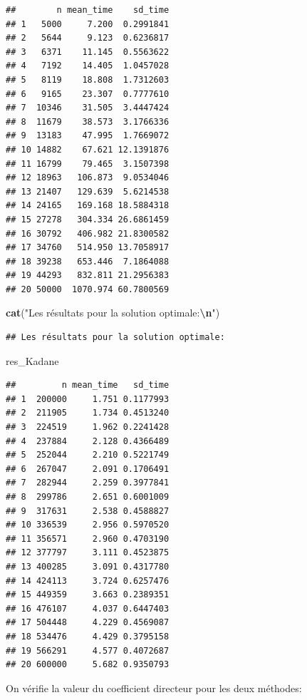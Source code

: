 \documentclass[
]{article}
\newenvironment{Shaded}{\begin{snugshade}}{\end{snugshade}}
\newcommand{\FunctionTok}[1]{\textcolor[rgb]{0.13,0.29,0.53}{\textbf{#1}}}
\newcommand{\NormalTok}[1]{#1}
\newcommand{\SpecialCharTok}[1]{\textcolor[rgb]{0.81,0.36,0.00}{\textbf{#1}}}
\newcommand{\StringTok}[1]{\textcolor[rgb]{0.31,0.60,0.02}{#1}}
\begin{document}
\begin{verbatim}
##        n mean_time    sd_time
## 1   5000     7.200  0.2991841
## 2   5644     9.123  0.6236817
## 3   6371    11.145  0.5563622
## 4   7192    14.405  1.0457028
## 5   8119    18.808  1.7312603
## 6   9165    23.307  0.7777610
## 7  10346    31.505  3.4447424
## 8  11679    38.573  3.1766336
## 9  13183    47.995  1.7669072
## 10 14882    67.621 12.1391876
## 11 16799    79.465  3.1507398
## 12 18963   106.873  9.0534046
## 13 21407   129.639  5.6214538
## 14 24165   169.168 18.5884318
## 15 27278   304.334 26.6861459
## 16 30792   406.982 21.8300582
## 17 34760   514.950 13.7058917
## 18 39238   653.446  7.1864088
## 19 44293   832.811 21.2956383
## 20 50000  1070.974 60.7800569
\end{verbatim}

\begin{Shaded}
\begin{Highlighting}[]
\FunctionTok{cat}\NormalTok{(}\StringTok{"Les résultats pour la solution optimale:}\SpecialCharTok{\textbackslash{}n}\StringTok{"}\NormalTok{)}
\end{Highlighting}
\end{Shaded}

\begin{verbatim}
## Les résultats pour la solution optimale:
\end{verbatim}

\begin{Shaded}
\begin{Highlighting}[]
\NormalTok{res\_Kadane}
\end{Highlighting}
\end{Shaded}

\begin{verbatim}
##         n mean_time   sd_time
## 1  200000     1.751 0.1177993
## 2  211905     1.734 0.4513240
## 3  224519     1.962 0.2241428
## 4  237884     2.128 0.4366489
## 5  252044     2.210 0.5221749
## 6  267047     2.091 0.1706491
## 7  282944     2.259 0.3977841
## 8  299786     2.651 0.6001009
## 9  317631     2.538 0.4588827
## 10 336539     2.956 0.5970520
## 11 356571     2.960 0.4703190
## 12 377797     3.111 0.4523875
## 13 400285     3.091 0.4317780
## 14 424113     3.724 0.6257476
## 15 449359     3.663 0.2389351
## 16 476107     4.037 0.6447403
## 17 504448     4.229 0.4569087
## 18 534476     4.429 0.3795158
## 19 566291     4.577 0.4072687
## 20 600000     5.682 0.9350793
\end{verbatim}

On vérifie la valeur du coefficient directeur pour les deux méthodes:
\end{document}
